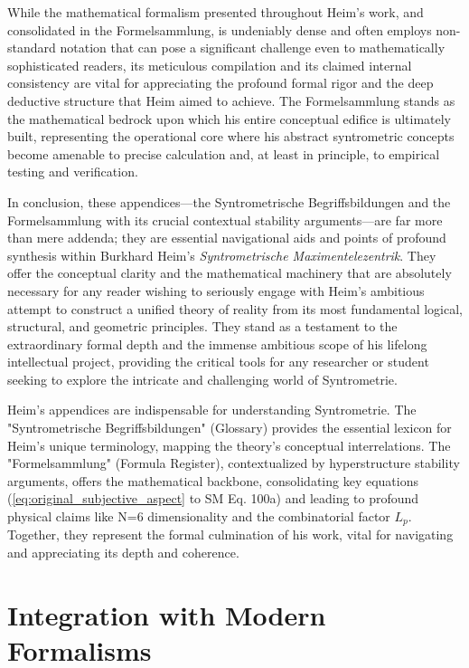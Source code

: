 \documentclass[12pt]{article}
\begin{document}
While the mathematical formalism presented throughout Heim's work, and consolidated in the Formelsammlung, is undeniably dense and often employs non-standard notation that can pose a significant challenge even to mathematically sophisticated readers, its meticulous compilation and its claimed internal consistency are vital for appreciating the profound formal rigor and the deep deductive structure that Heim aimed to achieve. The Formelsammlung stands as the mathematical bedrock upon which his entire conceptual edifice is ultimately built, representing the operational core where his abstract syntrometric concepts become amenable to precise calculation and, at least in principle, to empirical testing and verification.

In conclusion, these appendices—the Syntrometrische Begriffsbildungen and the Formelsammlung with its crucial contextual stability arguments—are far more than mere addenda; they are essential navigational aids and points of profound synthesis within Burkhard Heim's \textit{Syntrometrische Maximentelezentrik}. They offer the conceptual clarity and the mathematical machinery that are absolutely necessary for any reader wishing to seriously engage with Heim's ambitious attempt to construct a unified theory of reality from its most fundamental logical, structural, and geometric principles. They stand as a testament to the extraordinary formal depth and the immense ambitious scope of his lifelong intellectual project, providing the critical tools for any researcher or student seeking to explore the intricate and challenging world of Syntrometrie.

Heim's appendices are indispensable for understanding Syntrometrie. The "Syntrometrische Begriffsbildungen" (Glossary) provides the essential lexicon for Heim's unique terminology, mapping the theory's conceptual interrelations. The "Formelsammlung" (Formula Register), contextualized by hyperstructure stability arguments, offers the mathematical backbone, consolidating key equations (\eqref{eq:original_subjective_aspect} to SM Eq. 100a) and leading to profound physical claims like N=6 dimensionality and the combinatorial factor \(L_p\). Together, they represent the formal culmination of his work, vital for navigating and appreciating its depth and coherence.

\clearpage 

\section{Integration with Modern Formalisms}
\label{sec:chapter13}
\end{document}
